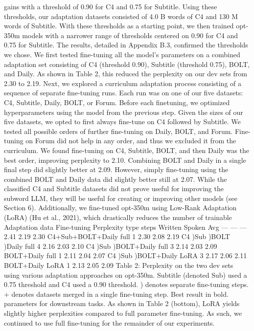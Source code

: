 gains with a threshold of 0.90 for C4 and 0.75 for
Subtitle. Using these thresholds, our adaptation
datasets consisted of 4.0 B words of C4 and 130 M
words of Subtitle. With these thresholds as a starting point, we then trained opt-350m models with a
narrower range of thresholds centered on 0.90 for
C4 and 0.75 for Subtitle. The results, detailed in
Appendix B.3, confirmed the thresholds we chose.
We first tested fine-tuning all the model’s parameters on a combined adaptation set consisting of C4
(threshold 0.90), Subtitle (threshold 0.75), BOLT,
and Daily. As shown in Table 2, this reduced the
perplexity on our dev sets from 2.30 to 2.19. Next,
we explored a curriculum adaptation process consisting of a sequence of separate fine-tuning runs.
Each run was on one of our five datasets: C4, Subtitle, Daily, BOLT, or Forum. Before each finetuning, we optimized hyperparameters using the
model from the previous step.
Given the sizes of our five datasets, we opted to
first always fine-tune on C4 followed by Subtitle.
We tested all possible orders of further fine-tuning
on Daily, BOLT, and Forum. Fine-tuning on Forum
did not help in any order, and thus we excluded it
from the curriculum. We found fine-tuning on C4,
Subtitle, BOLT, and then Daily was the best order,
improving perplexity to 2.10. Combining BOLT
and Daily in a single final step did slightly better
at 2.09. However, simply fine-tuning using the
combined BOLT and Daily data did slightly better
still at 2.07. While the classified C4 and Subtitle
datasets did not prove useful for improving the
subword LLM, they will be useful for creating or
improving other models (see Section 6).
Additionally, we fine-tuned opt-350m using
Low-Rank Adaptation (LoRA) (Hu et al., 2021),
which drastically reduces the number of trainable
Adaptation data Fine-tuning Perplexity
type steps Written Spoken Avg
— — — 2.41 2.19 2.30
C4+Sub+BOLT+Daily full 1 2.30 2.08 2.19
C4 )Sub )BOLT )Daily full 4 2.16 2.03 2.10
C4 )Sub )BOLT+Daily full 3 2.14 2.03 2.09
BOLT+Daily full 1 2.11 2.04 2.07
C4 )Sub )BOLT+Daily LoRA 3 2.17 2.06 2.11
BOLT+Daily LoRA 1 2.13 2.05 2.09
Table 2: Perplexity on the two dev sets using various
adaptation approaches on opt-350m. Subtitle (denoted
Sub) used a 0.75 threshold and C4 used a 0.90 threshold.
) denotes separate fine-tuning steps. + denotes datasets
merged in a single fine-tuning step. Best result in bold.
parameters for downstream tasks. As shown in
Table 2 (bottom), LoRA yields slightly higher perplexities compared to full parameter fine-tuning.
As such, we continued to use full fine-tuning for
the remainder of our experiments.
